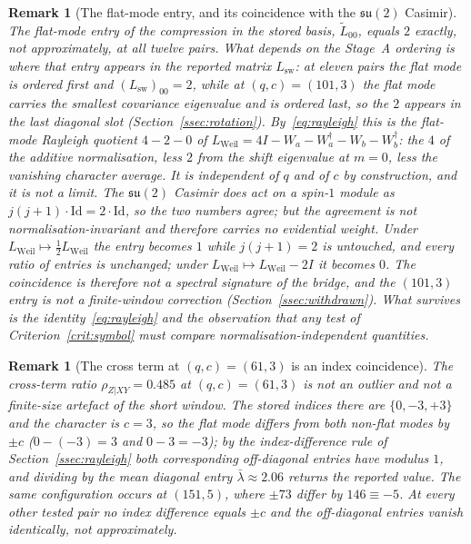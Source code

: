 \documentclass[11pt,a4paper]{article}
\newtheorem{remark}[theorem]{Remark}
\begin{document}
    \begin{remark}[The flat-mode entry, and its coincidence with the $\mathfrak{su}(2)$ Casimir]
      \label{rem:az2}
      The flat-mode entry of the compression in the stored basis, $\tilde L_{00}$, equals $2$
      exactly, not approximately, at all twelve pairs.
      What depends on the Stage~A ordering is where that entry appears in the reported matrix
      $L_{\mathrm{sw}}$: at eleven pairs the flat mode is ordered first and
      $(L_{\mathrm{sw}})_{00} = 2$, while at $(q,c) = (101,3)$ the flat mode carries the
      \emph{smallest} covariance eigenvalue and is ordered last, so the $2$ appears in the last
      diagonal slot (Section~\ref{ssec:rotation}).
      By~\eqref{eq:rayleigh} this is the flat-mode Rayleigh quotient $4 - 2 - 0$ of
      $L_{\mathrm{Weil}} = 4I - W_a - W_a^\dagger - W_b - W_b^\dagger$: the $4$ of the additive
      normalisation, less $2$ from the shift eigenvalue at $m = 0$, less the vanishing character
      average.
      It is independent of $q$ and of $c$ by construction, and it is not a limit.
      The $\mathfrak{su}(2)$ Casimir does act on a spin-$1$ module as
      $j(j+1)\cdot\mathrm{Id} = 2\cdot\mathrm{Id}$, so the two numbers agree; but the agreement is
      not normalisation-invariant and therefore carries no evidential weight.
      Under $L_{\mathrm{Weil}} \mapsto \tfrac12 L_{\mathrm{Weil}}$ the entry becomes $1$ while
      $j(j+1) = 2$ is untouched, and every ratio of entries is unchanged; under
      $L_{\mathrm{Weil}} \mapsto L_{\mathrm{Weil}} - 2I$ it becomes $0$.
      The coincidence is therefore not a spectral signature of the bridge, and the $(101,3)$ entry
      is not a finite-window correction (Section~\ref{ssec:withdrawn}).
      What survives is the identity~\eqref{eq:rayleigh} and the observation that any test of
      Criterion~\ref{crit:symbol} must compare normalisation-independent quantities.
    \end{remark}

    \begin{remark}[The cross term at $(q,c) = (61,3)$ is an index coincidence]
      \label{rem:finite}
      The cross-term ratio $\rho_{Z|XY} = 0.485$ at $(q,c)=(61,3)$ is not an outlier and not a
      finite-size artefact of the short window.
      The stored indices there are $\{0, -3, +3\}$ and the character is $c = 3$, so the flat mode
      differs from \emph{both} non-flat modes by $\pm c$ ($0 - (-3) = 3$ and $0 - 3 = -3$); by the
      index-difference rule of Section~\ref{ssec:rayleigh} both corresponding off-diagonal entries
      have modulus $1$, and dividing by the mean diagonal entry $\bar\lambda \approx 2.06$ returns
      the reported value.
      The same configuration occurs at $(151,5)$, where $\pm 73$ differ by $146 \equiv -5$.
      At every other tested pair no index difference equals $\pm c$ and the off-diagonal entries
      vanish identically, not approximately.
    \end{remark}
\end{document}
